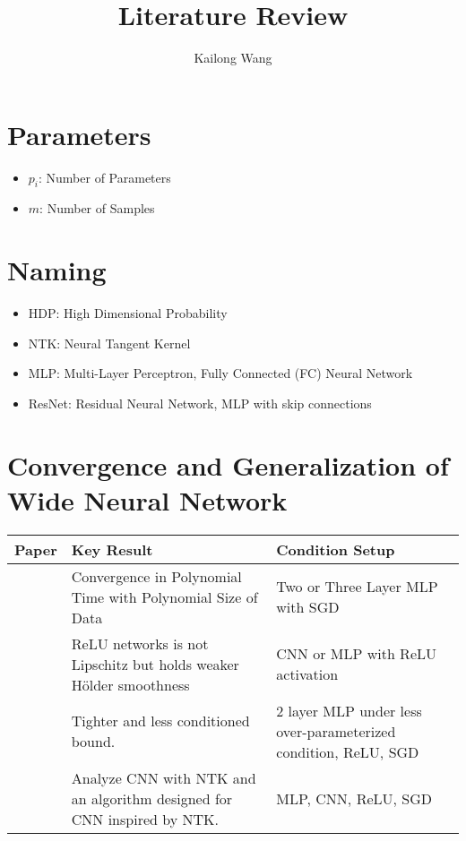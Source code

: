 \documentclass{article}
\title{Literature Review}
\author{Kailong Wang}
\date{}
\begin{document}
\maketitle

\section{Parameters}
\begin{itemize}
    \item $p_i$: Number of Parameters
    \item $m$: Number of Samples
\end{itemize}

\section{Naming}
\begin{itemize}
    \item HDP: High Dimensional Probability
    \item NTK: Neural Tangent Kernel
    \item MLP: Multi-Layer Perceptron, \aka Fully Connected (FC) Neural Network
    \item ResNet: Residual Neural Network, MLP with skip connections
\end{itemize}

\section{Convergence and Generalization of Wide Neural Network}

\begin{table}[H]
\centering
\begin{tabular}{|p{}|p{}|p{}|}
\hline
Paper & Key Result & Condition Setup \\
\hline
\cite{Allen-Zhu}        & Convergence in Polynomial Time with Polynomial Size of Data & Two or Three Layer MLP with SGD \\
\hline
\cite{Bietti}& ReLU networks is not Lipschitz but holds weaker H\"{o}lder smoothness           & CNN or MLP with ReLU activation \\
\hline
\cite{Nitanda}        & Tighter and less conditioned bound. & 2 layer MLP under less over-parameterized condition, ReLU, SGD \\
\hline
\cite{Arora2019}        & Analyze CNN with NTK and an algorithm designed for CNN inspired by NTK. & MLP, CNN, ReLU, SGD \\
\hline
\end{tabular}
\end{table}
\end{document}
